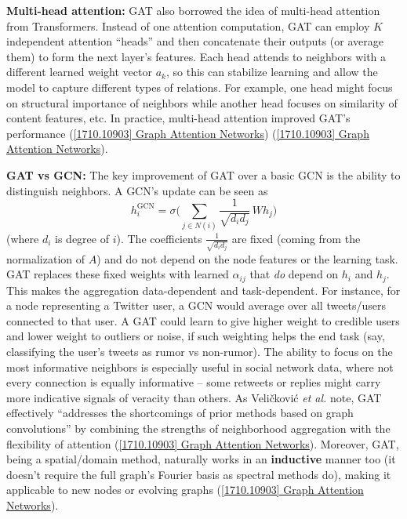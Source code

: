 \documentclass[12pt,a4paper]{report}
\begin{document}
\textbf{Multi-head attention:} GAT also borrowed the idea of multi-head attention from Transformers. Instead of one attention computation, GAT can employ \(K\) independent attention “heads” and then concatenate their outputs (or average them) to form the next layer’s features. Each head attends to neighbors with a different learned weight vector \(a_k\), so this can stabilize learning and allow the model to capture different types of relations. For example, one head might focus on structural importance of neighbors while another head focuses on similarity of content features, etc. In practice, multi-head attention improved GAT’s performance (\href{https://arxiv.org/abs/1710.10903#:~:text=,and%20make%20our%20model%20readily}{[1710.10903] Graph Attention Networks}) (\href{https://arxiv.org/abs/1710.10903#:~:text=achieved%20or%20matched%20state,graphs%20remain%20unseen%20during%20training}{[1710.10903] Graph Attention Networks}).

\textbf{GAT vs GCN:} The key improvement of GAT over a basic GCN is the ability to distinguish neighbors. A GCN’s update can be seen as 
\[
h_i^{\text{GCN}} = \sigma\Big(\sum_{j \in N(i)} \frac{1}{\sqrt{d_i d_j}}\,W h_j\Big)
\]
(where \(d_i\) is degree of \(i\)). The coefficients \(\frac{1}{\sqrt{d_i d_j}}\) are fixed (coming from the normalization of \(A\)) and do not depend on the node features or the learning task. GAT replaces these fixed weights with learned \(\alpha_{ij}\) that \textit{do} depend on \(h_i\) and \(h_j\). This makes the aggregation data-dependent and task-dependent. For instance, for a node representing a Twitter user, a GCN would average over all tweets/users connected to that user. A GAT could learn to give higher weight to credible users and lower weight to outliers or noise, if such weighting helps the end task (say, classifying the user’s tweets as rumor vs non-rumor). The ability to focus on the most informative neighbors is especially useful in social network data, where not every connection is equally informative – some retweets or replies might carry more indicative signals of veracity than others. As Veličković \textit{et al.} note, GAT effectively “addresses the shortcomings of prior methods based on graph convolutions” by combining the strengths of neighborhood aggregation with the flexibility of attention (\href{https://arxiv.org/abs/1710.10903#:~:text=attentional%20layers%20to%20address%20the,Our%20GAT%20models%20have}{[1710.10903] Graph Attention Networks}). Moreover, GAT, being a spatial/domain method, naturally works in an \textbf{inductive} manner too (it doesn’t require the full graph’s Fourier basis as spectral methods do), making it applicable to new nodes or evolving graphs (\href{https://arxiv.org/abs/1710.10903#:~:text=attentional%20layers%20to%20address%20the,Our%20GAT%20models%20have}{[1710.10903] Graph Attention Networks}).
\end{document}
